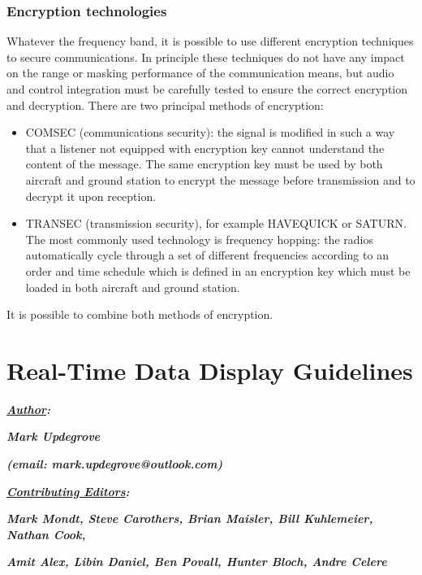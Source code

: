 \documentclass[
]{book}
\begin{document}
\hypertarget{encryption-technologies}{%
\subsection{Encryption technologies}\label{encryption-technologies}}

Whatever the frequency band, it is possible to use different encryption
techniques to secure communications. In principle these techniques do not have
any impact on the range or masking performance of the communication means, but
audio and control integration must be carefully tested to ensure the correct
encryption and decryption. There are two principal methods of encryption:

\begin{itemize}
\item
  COMSEC (communications security): the signal is modified in such a way that a
  listener not equipped with encryption key cannot understand the content of the
  message. The same encryption key must be used by both aircraft and ground
  station to encrypt the message before transmission and to decrypt it upon
  reception.
\item
  TRANSEC (transmission security), for example HAVEQUICK or SATURN. The most
  commonly used technology is frequency hopping: the radios automatically cycle
  through a set of different frequencies according to an order and time schedule
  which is defined in an encryption key which must be loaded in both aircraft and
  ground station.
\end{itemize}

It is possible to combine both methods of encryption.

\hypertarget{real-time-data-display-guidelines}{%
\chapter{Real-Time Data Display Guidelines}\label{real-time-data-display-guidelines}}

\textbf{\emph{\underline{Author}:}}

\textbf{\emph{Mark Updegrove}}

\textbf{\emph{(email: mark.updegrove@outlook.com)}}

\textbf{\emph{\underline{Contributing Editors}:}}

\textbf{\emph{Mark Mondt, Steve Carothers, Brian Maisler, Bill Kuhlemeier, Nathan Cook,}}

\textbf{\emph{Amit Alex, Libin Daniel, Ben Povall, Hunter Bloch, Andre Celere}}
\end{document}
